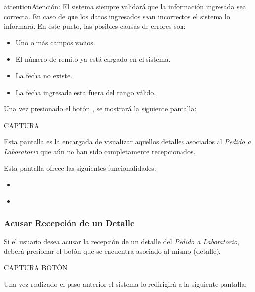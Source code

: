\documentclass[a4paper,10pt,spanish]{sphinxmanual}
\begin{document}
\begin{notice}{attention}{Atención:}
El sistema siempre validará que la información ingresada sea correcta. En caso de que los datos ingresados sean incorrectos el sistema lo informará.
En este punto, las posibles causas de errores son:
\begin{itemize}
\item {} 
Uno o más campos vacios.

\item {} 
El número de remito ya está cargado en el sistema.

\item {} 
La fecha no existe.

\item {} 
La fecha ingresada esta fuera del rango válido.

\end{itemize}
\end{notice}

Una vez presionado el botón , se mostrará la siguiente pantalla:

CAPTURA

Esta pantalla es la encargada de visualizar aquellos detalles asociados al \emph{Pedido a Laboratorio} que aún no han sido completamente recepcionados.

Esta pantalla ofrece las siguientes funcionalidades:
\begin{itemize}
\item {} 
{\hyperref[receppedidosdelab:recepcion\string-detalle\string-rpl]{}}

\item {} 
{\hyperref[receppedidosdelab:registrar\string-pedido\string-rpl]{}}

\end{itemize}


\subsubsection{Acusar Recepción de un Detalle}
\label{receppedidosdelab:acusar-recepcion-de-un-detalle}\label{receppedidosdelab:recepcion-detalle-rpl}
Si el usuario desea acusar la recepción de un detalle del \emph{Pedido a Laboratorio}, deberá presionar el botón  que se encuentra asociado al mismo (detalle).

CAPTURA BOTÓN

Una vez realizado el paso anterior el sistema lo redirigirá a la siguiente pantalla:
\end{document}
